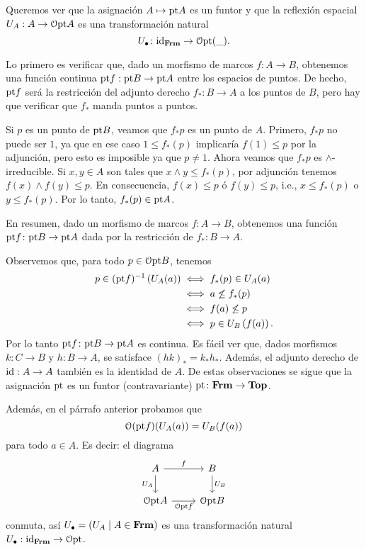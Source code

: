 \documentclass{comunicaciones}
\begin{document}
Queremos ver que la asignación $A\mapsto \mathrm{pt} A$ es un funtor y que
la reflexión espacial $U_A:A\to\mathcal{O}\mathrm{pt} A$
es una transformación natural
\[U_\bullet\colon\mathrm{id}_{\mathbf{Frm}}\to\mathcal{O}\mathrm{pt}(\_).\]

Lo primero es verificar que, dado un morfismo de marcos $f\colon A\to B$,
obtenemos una función continua $\mathrm{pt} f:\mathrm{pt} B\to\mathrm{pt} A$ entre los
espacios de puntos. De hecho, $\mathrm{pt} f$ será la restricción del adjunto
derecho $f_*\colon B\to A$ a los puntos de $B$, pero hay que verificar que
$f_*$ manda puntos a puntos.

Si $p$ es un punto de $\mathrm{pt} B$, veamos que $f_*p$ es un punto de $A$.
Primero, $f_*p$ no puede ser $1$, ya que en ese caso $1\leq f_\ast(p)$
implicaría $f(1)\leq p$ por la adjunción, pero esto es imposible ya
que $p\neq 1$.
Ahora veamos que $f_*p$ es $\wedge$-irreducible. Si $x,y\in A$ son tales
que $x\wedge y\leq f_\ast(p)$, por adjunción tenemos $f(x)\wedge f(y)\leq p$.
En consecuencia, $f(x)\leq p$ ó $f(y)\leq p$, i.e., $x\leq f_\ast (p)$
o $y\leq f_\ast (p)$. Por lo tanto, $f_\ast (p)\in \mathrm{pt} A$.

En resumen, dado un morfismo de marcos $f\colon A\to B$, obtenemos una
función $\mathrm{pt} f \colon \mathrm{pt} B\to \mathrm{pt} A$ dada por la restricción de
$f_*:B\to A$.

Observemos que, para todo $p\in \mathcal{O}\mathrm{pt} B$, tenemos
\begin{align*}
    p\in (\mathrm{pt} f)^{-1} \left(U_A(a)\right)&\iff f_\ast (p)\in U_A(a)\\
    &\iff a\not\leq f_\ast (p)\\
    &\iff f(a)\not\leq p\\
    &\iff p\in U_B\left(f(a)\right).
\end{align*}
Por lo tanto $\mathrm{pt} f\colon \mathrm{pt} B\to \mathrm{pt} A$ es continua.
Es fácil ver que, dados morfismos $k:C\to B$ y $h:B\to A$,
se satisface $(hk)_*=k_*h_*$. Además, el adjunto derecho de $\mathrm{id}:A\to A$ también es la identidad
de $A$.
De estas observaciones se sigue que la asignación $\mathrm{pt}$
es un funtor (contravariante) $\mathrm{pt}\colon \mathbf{Frm}\to\mathbf{Top}$.

Además, en el párrafo anterior probamos que
\[
    \mathcal{O}(\mathrm{pt} f)(U_A(a)) = U_B(f(a))
\]
para todo $a\in A$.
Es decir: el diagrama
\[
    \begin{tikzcd}
        A \ar[r,"f"] \ar[d,"U_A"'] & B \ar[d,"U_B"] \\
        \Cal O\pt A \ar[r,"\Cal O\pt f"'] & \Cal O\pt B
    \end{tikzcd}
\]
conmuta, así $U_\bullet=(U_A\mid A\in\mathbf{Frm})$
es una transformación natural $U_\bullet:\mathrm{id}_{\mathbf{Frm}}\to\mathcal{O}\mathrm{pt}$.
\end{document}
